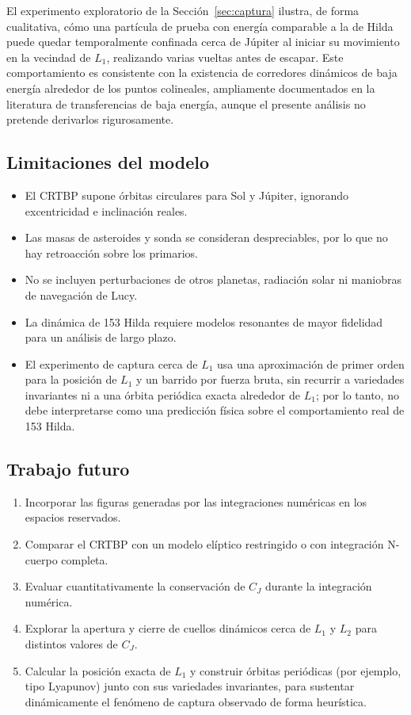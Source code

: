 \documentclass[12pt,a4paper]{article}
\begin{document}
El experimento exploratorio de la Sección~\ref{sec:captura} ilustra, de forma cualitativa, cómo una partícula de prueba con energía comparable a la de Hilda puede quedar temporalmente confinada cerca de Júpiter al iniciar su movimiento en la vecindad de \(L_1\), realizando varias vueltas antes de escapar. Este comportamiento es consistente con la existencia de corredores dinámicos de baja energía alrededor de los puntos colineales, ampliamente documentados en la literatura de transferencias de baja energía, aunque el presente análisis no pretende derivarlos rigurosamente.

\subsection{Limitaciones del modelo}
\begin{itemize}
  \item El CRTBP supone órbitas circulares para Sol y Júpiter, ignorando excentricidad e inclinación reales.
  \item Las masas de asteroides y sonda se consideran despreciables, por lo que no hay retroacción sobre los primarios.
  \item No se incluyen perturbaciones de otros planetas, radiación solar ni maniobras de navegación de Lucy.
  \item La dinámica de 153 Hilda requiere modelos resonantes de mayor fidelidad para un análisis de largo plazo.
  \item El experimento de captura cerca de \(L_1\) usa una aproximación de primer orden para la posición de \(L_1\) y un barrido por fuerza bruta, sin recurrir a variedades invariantes ni a una órbita periódica exacta alrededor de \(L_1\); por lo tanto, no debe interpretarse como una predicción física sobre el comportamiento real de 153 Hilda.
\end{itemize}

\subsection{Trabajo futuro}
\begin{enumerate}
  \item Incorporar las figuras generadas por las integraciones numéricas en los espacios reservados.
  \item Comparar el CRTBP con un modelo elíptico restringido o con integración N-cuerpo completa.
  \item Evaluar cuantitativamente la conservación de \(C_J\) durante la integración numérica.
  \item Explorar la apertura y cierre de cuellos dinámicos cerca de \(L_1\) y \(L_2\) para distintos valores de \(C_J\).
  \item Calcular la posición exacta de \(L_1\) y construir órbitas periódicas (por ejemplo, tipo Lyapunov) junto con sus variedades invariantes, para sustentar dinámicamente el fenómeno de captura observado de forma heurística.
\end{enumerate}
\end{document}
